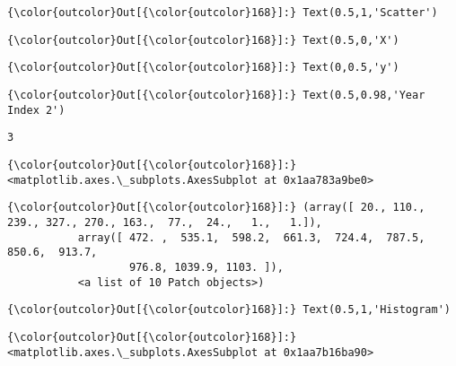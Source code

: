 \documentclass[11pt]{article}
\begin{document}
\begin{Verbatim}[commandchars=\\\{\}]
{\color{outcolor}Out[{\color{outcolor}168}]:} Text(0.5,1,'Scatter')
\end{Verbatim}
            
\begin{Verbatim}[commandchars=\\\{\}]
{\color{outcolor}Out[{\color{outcolor}168}]:} Text(0.5,0,'X')
\end{Verbatim}
            
\begin{Verbatim}[commandchars=\\\{\}]
{\color{outcolor}Out[{\color{outcolor}168}]:} Text(0,0.5,'y')
\end{Verbatim}
            
\begin{Verbatim}[commandchars=\\\{\}]
{\color{outcolor}Out[{\color{outcolor}168}]:} Text(0.5,0.98,'Year Index 2')
\end{Verbatim}
            
    \begin{Verbatim}[commandchars=\\\{\}]
3

    \end{Verbatim}

\begin{Verbatim}[commandchars=\\\{\}]
{\color{outcolor}Out[{\color{outcolor}168}]:} <matplotlib.axes.\_subplots.AxesSubplot at 0x1aa783a9be0>
\end{Verbatim}
            
\begin{Verbatim}[commandchars=\\\{\}]
{\color{outcolor}Out[{\color{outcolor}168}]:} (array([ 20., 110., 239., 327., 270., 163.,  77.,  24.,   1.,   1.]),
           array([ 472. ,  535.1,  598.2,  661.3,  724.4,  787.5,  850.6,  913.7,
                   976.8, 1039.9, 1103. ]),
           <a list of 10 Patch objects>)
\end{Verbatim}
            
\begin{Verbatim}[commandchars=\\\{\}]
{\color{outcolor}Out[{\color{outcolor}168}]:} Text(0.5,1,'Histogram')
\end{Verbatim}
            
\begin{Verbatim}[commandchars=\\\{\}]
{\color{outcolor}Out[{\color{outcolor}168}]:} <matplotlib.axes.\_subplots.AxesSubplot at 0x1aa7b16ba90>
\end{Verbatim}
            
\end{document}
